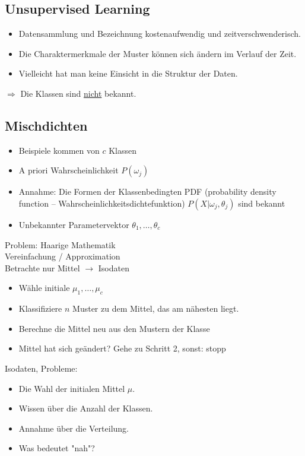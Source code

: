\subsection{Unsupervised Learning}

\begin{itemize}
\item Datensammlung und Bezeichnung kostenaufwendig und zeitverschwenderisch.
\item Die Charaktermerkmale der Muster können sich ändern im Verlauf der Zeit.
\item Vielleicht hat man keine Einsicht in die Struktur der Daten.
\end{itemize}
$\Rightarrow$ Die Klassen sind \underline{nicht} bekannt.

\subsection{Mischdichten}

\begin{itemize}
\item Beispiele kommen von $c$ Klassen
\item A priori Wahrscheinlichkeit $P(\omega_j)$
\item Annahme: Die Formen der Klassenbedingten PDF (probability density function -- Wahrscheinlichkeitsdichtefunktion) $P(X | \omega_j , \theta_j)$ sind bekannt
\item Unbekannter Parametervektor $\theta_1, \dots, \theta_c$
\end{itemize}
Problem: Haarige Mathematik \\ Vereinfachung / Approximation \\ Betrachte nur Mittel $\to$ Isodaten
\begin{itemize}
\item Wähle initiale $\mu_1, \dots, \mu_c$
\item Klassifiziere $n$ Muster zu dem Mittel, das am nähesten liegt.
\item Berechne die Mittel neu aus den Mustern der Klasse
\item Mittel hat sich geändert? Gehe zu Schritt 2, sonst: stopp
\end{itemize}
Isodaten, Probleme:
\begin{itemize}
\item Die Wahl der initialen Mittel $\mu$.
\item Wissen über die Anzahl der Klassen.
\item Annahme über die Verteilung.
\item Was bedeutet "{}nah"{}?
\end{itemize}

